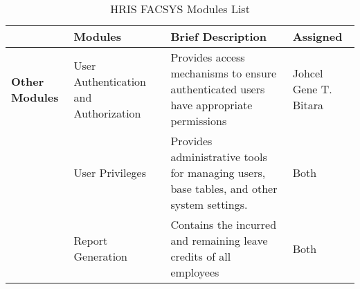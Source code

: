 \begin{table}[H]
    \begin{tabular}{@{}p{2cm}p{3.5cm}p{6cm}p{3.5cm}@{}}
    \toprule
    \multicolumn{1}{l}{} & \textbf{Modules}                  & \textbf{Brief Description}                                                                                                               & \textbf{Assigned}  \\ \midrule
    \textbf{Other Modules}      & User Authentication and Authorization                & Provides access mechanisms to ensure authenticated users have appropriate permissions & Johcel Gene T. Bitara               \\
                            & User Privileges                  & Provides administrative tools for managing users, base tables, and other system settings.                           & Both               \\
                            & Report Generation           & Contains the incurred and remaining leave credits of all employees                                                                       & Both              \\ \bottomrule
    \end{tabular}
    \caption{HRIS FACSYS Modules List}
    \label{tab:hris-other-modules}
\end{table}
            
    